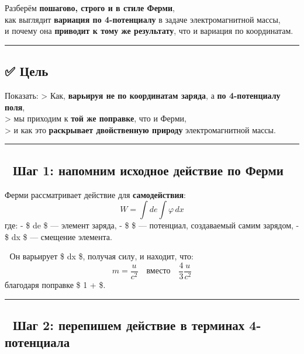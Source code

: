 \documentclass[11pt]{article}
\begin{document}
Разберём \textbf{пошагово, строго и в стиле Ферми},\\
как выглядит \textbf{вариация по 4-потенциалу} в задаче электромагнитной
массы,\\
и почему она \textbf{приводит к тому же результату}, что и вариация по
координатам.

\begin{center}\rule{0.5\linewidth}{\linethickness}\end{center}

\subsection{✅ Цель}\label{ux446ux435ux43bux44c}

Показать: \textgreater{} Как, \textbf{варьируя не по координатам
заряда}, а \textbf{по 4-потенциалу поля},\\
\textgreater{} мы приходим к \textbf{той же поправке}, что и Ферми,\\
\textgreater{} и как это \textbf{раскрывает двойственную природу}
электромагнитной массы.

\begin{center}\rule{0.5\linewidth}{\linethickness}\end{center}

\subsection{🔹 Шаг 1: напомним исходное действие по
Ферми}\label{ux448ux430ux433-1-ux43dux430ux43fux43eux43cux43dux438ux43c-ux438ux441ux445ux43eux434ux43dux43eux435-ux434ux435ux439ux441ux442ux432ux438ux435-ux43fux43e-ux444ux435ux440ux43cux438}

Ферми рассматривает действие для \textbf{самодействия}: \[
W = \int de \int \varphi \, dx
\] где: - \$ de \$ --- элемент заряда, - \$ \varphi \$ --- потенциал,
создаваемый самим зарядом, - \$ dx \$ --- смещение элемента.

📌 Он варьирует \$ dx \$, получая силу, и находит, что: \[
m = \frac{u}{c^2} \quad \text{вместо} \quad \frac{4}{3} \frac{u}{c^2}
\] благодаря поправке \$ 1 +  \$.

\begin{center}\rule{0.5\linewidth}{\linethickness}\end{center}

\subsection{🔹 Шаг 2: перепишем действие в терминах
4-потенциала}\label{ux448ux430ux433-2-ux43fux435ux440ux435ux43fux438ux448ux435ux43c-ux434ux435ux439ux441ux442ux432ux438ux435-ux432-ux442ux435ux440ux43cux438ux43dux430ux445-4-ux43fux43eux442ux435ux43dux446ux438ux430ux43bux430}
\end{document}
